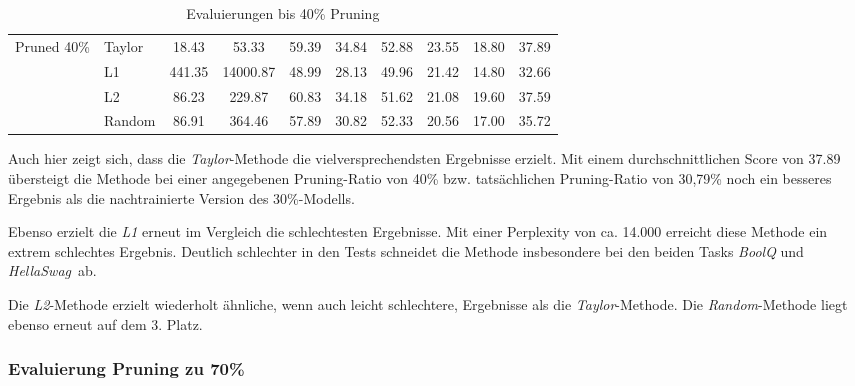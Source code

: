 \begin{table}[h]
{\begin{tabular}{l l | c c | c c c c c | r}
			\multirow{4}{*}{Pruned 40\%} & Taylor          & 18.43              & 53.33
			                             & 59.39           & 34.84              & 52.88
			                             & 23.55           & 18.80              & 37.89            \\

			                             & L1              & 441.35             & 14000.87
			                             & 48.99           & 28.13              & 49.96
			                             & 21.42           & 14.80              & 32.66            \\


			                             & L2              & 86.23              & 229.87
			                             & 60.83           & 34.18              & 51.62
			                             & 21.08           & 19.60              & 37.59            \\


			                             & Random          & 86.91              & 364.46
			                             & 57.89           & 30.82              & 52.33
			                             & 20.56           & 17.00              & 35.72            \\
			\bottomrule
			\bottomrule
		\end{tabular}}
	\caption{Evaluierungen bis 40\% Pruning}
	\label{tab:pruning40}
\end{table}

Auch hier zeigt sich, dass die \emph{Taylor}-Methode die vielversprechendsten
Ergebnisse erzielt. Mit einem durchschnittlichen Score von 37.89 übersteigt die
Methode bei einer angegebenen Pruning-Ratio von 40\% bzw. tatsächlichen
Pruning-Ratio von 30,79\% noch ein besseres Ergebnis als die nachtrainierte
Version des 30\%-Modells.

Ebenso erzielt die \emph{L1} erneut im Vergleich die schlechtesten Ergebnisse.
Mit einer Perplexity von ca. 14.000 erreicht diese Methode ein extrem schlechtes
Ergebnis. Deutlich schlechter in den Tests schneidet die Methode insbesondere
bei den beiden Tasks \emph{BoolQ} und \emph{HellaSwag} ab.

Die \emph{L2}-Methode erzielt wiederholt ähnliche, wenn auch leicht schlechtere,
Ergebnisse als die \emph{Taylor}-Methode. Die \emph{Random}-Methode liegt ebenso
erneut auf dem 3. Platz.

\subsubsection{Evaluierung Pruning zu 70\%}

